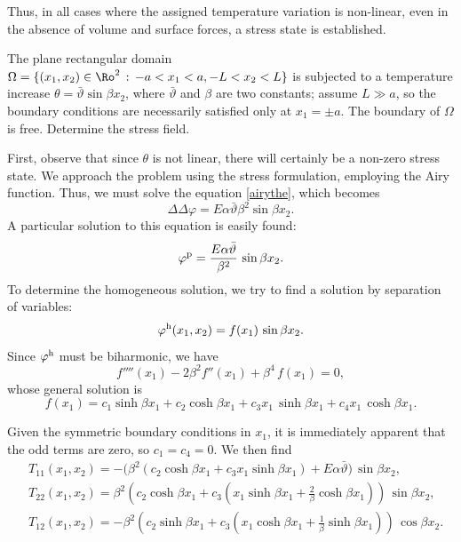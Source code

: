 Thus, in all cases where the assigned temperature variation is non-linear, even in the absence of volume and surface forces, a stress state is established.

\begin{exercise}
	The plane rectangular domain $\Omega=\{(x_1,x_2)\in \Ro^2 \,:\, -a<x_1<a, -L<x_2<L  \}$ is subjected to a temperature increase $\theta=\bar{\vartheta} \sin \beta x_2$, where $\bar{\vartheta}$ and $\beta$ are two constants; assume $L\gg a$, so the boundary conditions are necessarily satisfied only at $x_1=\pm a$. The boundary of $\Omega$ is free. Determine the stress field.
	\begin{svolgimento}
		First, observe that since $\theta$ is not linear, there will certainly be a non-zero stress state. We approach the problem using the stress formulation, employing the Airy function. Thus, we must solve the equation  \eqref{airythe}, which becomes
		\begin{equation}
			\Delta\Delta \varphi=E\alpha\bar{\vartheta}\beta^2\sin \beta x_2.
		\end{equation}
		A particular solution to this equation is easily found:
		\begin{equation}
			\varphi^{\rm p}=\frac{E\alpha\bar{\vartheta}}{\beta^2}\, \sin \beta x_2.
		\end{equation}
		To determine the homogeneous solution, we try to find a solution by separation of variables:
		\begin{equation}
			\varphi^{\rm h}(x_1, x_2)=f(x_1)\,\sin \beta x_2.
		\end{equation}
		Since $\varphi^{\rm h}$ must be biharmonic, we have
		\begin{equation}
			f''''(x_1)-2\beta^2 f''(x_1)+\beta^4\, f(x_1)=0,
		\end{equation}
		whose general solution is
		\begin{equation}
			f(x_1)=c_1 \sinh \beta x_1+c_2\cosh \beta x_1+c_3 x_1\, \sinh\beta x_1+c_4 x_1\, \cosh \beta x_1.
		\end{equation}
		
		Given the symmetric boundary conditions in $x_1$, it is immediately apparent that the odd terms are zero, so $c_1=c_4=0$. We then find
		\begin{equation}
			\begin{aligned}
				&T_{11}(x_1, x_2)=-\Big( \beta^2 (c_2\cosh \beta x_1+c_3 x_1 \sinh \beta x_1)+E\alpha\bar{\vartheta} \Big)\,\sin\beta x_2,\\
				& T_{22}(x_1,x_2)=\beta^2\left( c_2\cosh\beta x_1+c_3\left( x_1\sinh \beta x_1+\frac{2}{\beta}\cosh \beta x_1 \right)  \right)\,\sin\beta x_2,\\
				&T_{12}(x_1,x_2)=-\beta^2 \left( c_2\sinh\beta x_1+c_3\left( x_1\cosh \beta x_1+\frac{1}{\beta}\sinh \beta x_1 \right)  \right)\,\cos\beta x_2.
			\end{aligned}
		\end{equation}
		

\end{svolgimento}
\end{exercise}
